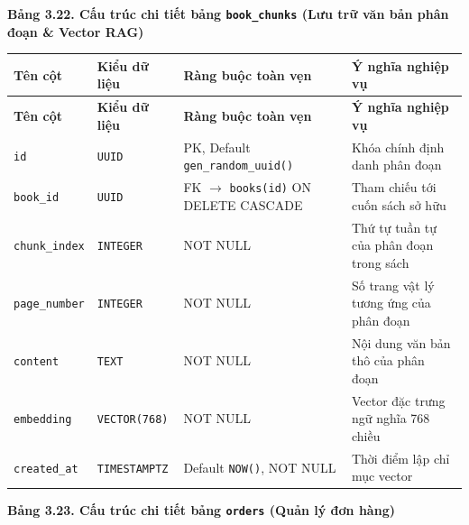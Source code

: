 \documentclass[11pt, a4paper]{report}
\begin{document}
\vspace{0.3cm}
\noindent\textbf{Bảng 3.22. Cấu trúc chi tiết bảng \texttt{book\_chunks} (Lưu trữ văn bản phân đoạn \& Vector RAG)}

\begin{longtable}{p{3.2cm} p{2.6cm} p{4.0cm} p{4.5cm}}
\toprule
\textbf{Tên cột} & \textbf{Kiểu dữ liệu} & \textbf{Ràng buộc toàn vẹn} & \textbf{Ý nghĩa nghiệp vụ} \\
\midrule
\endfirsthead
\toprule
\textbf{Tên cột} & \textbf{Kiểu dữ liệu} & \textbf{Ràng buộc toàn vẹn} & \textbf{Ý nghĩa nghiệp vụ} \\
\midrule
\endhead
\bottomrule
\endfoot
\texttt{id} & \texttt{UUID} & PK, Default \texttt{gen\_random\_uuid()} & Khóa chính định danh phân đoạn \\
\midrule
\texttt{book\_id} & \texttt{UUID} & FK $\rightarrow$ \texttt{books(id)} ON DELETE CASCADE & Tham chiếu tới cuốn sách sở hữu \\
\midrule
\texttt{chunk\_index} & \texttt{INTEGER} & NOT NULL & Thứ tự tuần tự của phân đoạn trong sách \\
\midrule
\texttt{page\_number} & \texttt{INTEGER} & NOT NULL & Số trang vật lý tương ứng của phân đoạn \\
\midrule
\texttt{content} & \texttt{TEXT} & NOT NULL & Nội dung văn bản thô của phân đoạn \\
\midrule
\texttt{embedding} & \texttt{VECTOR(768)} & NOT NULL & Vector đặc trưng ngữ nghĩa 768 chiều \\
\midrule
\texttt{created\_at} & \texttt{TIMESTAMPTZ} & Default \texttt{NOW()}, NOT NULL & Thời điểm lập chỉ mục vector \\
\bottomrule
\end{longtable}

\vspace{0.3cm}
\noindent\textbf{Bảng 3.23. Cấu trúc chi tiết bảng \texttt{orders} (Quản lý đơn hàng)}
\end{document}

